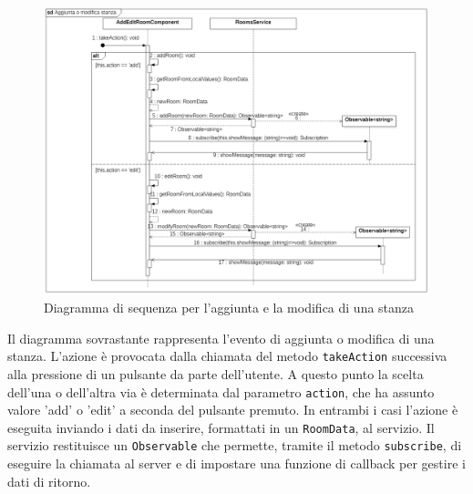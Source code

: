 \begin{figure}[H]
	\centering
	\includegraphics[width=18cm]{res/images/webapp-addEditStanzePostazioni-diagrammaSequenza.png}
	\caption{Diagramma di sequenza per l'aggiunta e la modifica di una stanza}
	\label{fig:DiagrammaSequenzaStanzePostazioni2}
\end{figure}

Il diagramma sovrastante rappresenta l'evento di aggiunta o modifica di una stanza.
L'azione è provocata dalla chiamata del metodo \texttt{takeAction} successiva alla pressione di un pulsante da parte dell'utente. A questo punto la scelta dell'una o dell'altra via è determinata dal parametro \texttt{action}, che ha assunto valore 'add' o 'edit' a seconda del pulsante premuto. In entrambi i casi l'azione è eseguita inviando i dati da inserire, formattati in un \texttt{RoomData}, al servizio. Il servizio restituisce un \texttt{Observable} che permette, tramite il metodo \texttt{subscribe}, di eseguire la chiamata al server e di impostare una funzione di callback per gestire i dati di ritorno. 
